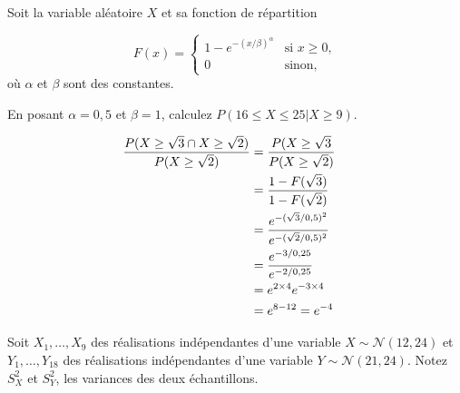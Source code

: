 \begin{questions}
\pageblanche

\question[8] Soit la variable aléatoire $X$ et sa fonction de répartition

\[ F(x) =
\begin{cases}
   \displaystyle 1-e^{-(x/\beta)^\alpha}& \text{si } x \ge 0, \\
    0 & \text{sinon},
\end{cases}
\]
où $\alpha$ et $\beta$ sont des constantes.

En posant $\alpha = 0,5$ et $\beta=1$, calculez $P(16 \leq X \leq 25 | X\geq 9)$.

\begin{solution}
    \begin{align*}
        \frac{P(X \geq \sqrt{3} \cap X \geq \sqrt{2})}{P(X \geq \sqrt{2})}
        &= \frac{P(X \geq \sqrt{3} }{P(X \geq \sqrt{2})} \cr
        &=\frac{1-F(\sqrt{3})}{1-F(\sqrt{2})} \cr
        &=\frac{e^{-(\sqrt{3}/0,5)^2}}{e^{-(\sqrt{2}/0,5)^2}}\cr
        &= \frac{e^{-3/0,25}}{e^{-2/0,25}} \cr
        &= e^{2 \times 4}e^{-3\times 4} \cr
        &= e^{8-12} = e^{-4}
    \end{align*}
\end{solution}



\pageblanche
\question[10]\label{estimateursPonctuels} 
Soit $X_1,\hdots,X_9$ des réalisations indépendantes d'une variable $X\sim\mathcal{N}(12, 24)$ et $Y_1,\hdots,Y_{18}$ des réalisations indépendantes d'une variable $Y\sim\mathcal{N}(21, 24)$. 
Notez $S_X^2$ et $S_Y^2$, les variances des deux échantillons.


\end{questions}

